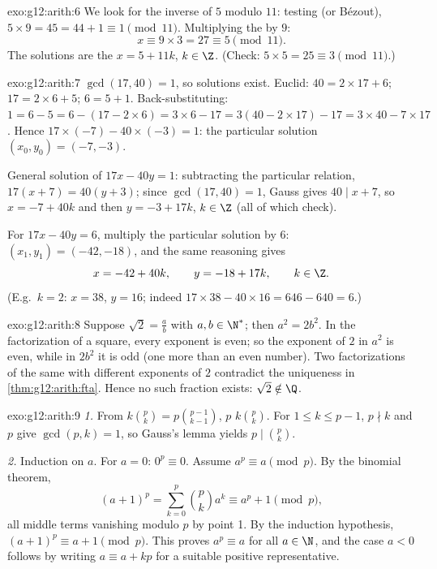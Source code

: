\begin{solution}{exo:g12:arith:6}
We look for the inverse of $5$ modulo $11$: testing (or Bézout),
$5 \times 9 = 45 = 44 + 1 \equiv 1 \pmod{11}$. Multiplying the  by
$9$:
\[
x \equiv 9 \times 3 = 27 \equiv 5 \pmod{11}.
\]
The solutions are the  $x = 5 + 11k$, $k \in \Z$. (Check:
$5\times5 = 25 \equiv 3 \pmod{11}$.)
\end{solution}

\begin{solution}{exo:g12:arith:7}
$\gcd(17, 40) = 1$, so solutions exist. Euclid:
$40 = 2\times17 + 6$; $17 = 2\times6 + 5$; $6 = 5 + 1$. Back-substituting:
$1 = 6 - 5 = 6 - (17 - 2\times6) = 3\times6 - 17
= 3(40 - 2\times17) - 17 = 3\times40 - 7\times17$. Hence
$17\times(-7) - 40\times(-3) = 1$: the particular solution
$(x_0, y_0) = (-7, -3)$.

General solution of $17x - 40y = 1$: subtracting the particular relation,
$17(x + 7) = 40(y + 3)$; since $\gcd(17, 40) = 1$, Gauss gives
$40 \mid x + 7$, so $x = -7 + 40k$ and then $y = -3 + 17k$, $k \in \Z$
(all of which check).

For $17x - 40y = 6$, multiply the particular solution by $6$:
$(x_1, y_1) = (-42, -18)$, and the same reasoning gives
\[
x = -42 + 40k, \qquad y = -18 + 17k, \qquad k \in \Z .
\]
(E.g.\ $k = 2$: $x = 38$, $y = 16$; indeed $17\times38 - 40\times16
= 646 - 640 = 6$.)
\end{solution}

\begin{solution}{exo:g12:arith:8}
Suppose $\sqrt2 = \frac ab$ with $a, b \in \N^*$; then $a^2 = 2b^2$. In the
 factorization of a square, every exponent is even; so the exponent of
$2$ in $a^2$ is even, while in $2b^2$ it is odd (one more than an even
number). Two factorizations of the same  with different exponents of
$2$ contradict the uniqueness in \cref{thm:g12:arith:fta}. Hence no such
fraction exists: $\sqrt2 \notin \Q$.
\end{solution}

\begin{solution}{exo:g12:arith:9}
\emph{1.} From $k\binom pk = p \binom{p-1}{k-1}$, $p$ 
$k\binom pk$. For $1 \leq k \leq p-1$, $p \nmid k$ and $p$  give
$\gcd(p, k) = 1$, so Gauss's lemma yields $p \mid \binom pk$.

\emph{2.} Induction on $a$. For $a = 0$: $0^p \equiv 0$. Assume
$a^p \equiv a \pmod p$. By the binomial theorem,
\[
(a+1)^p = \sum_{k=0}^{p} \binom pk a^k
\equiv a^p + 1 \pmod p,
\]
all middle terms vanishing modulo $p$ by point 1. By the induction
hypothesis, $(a+1)^p \equiv a + 1 \pmod p$. This proves
$a^p \equiv a$ for all $a \in \N$, and the case $a < 0$ follows by writing
$a \equiv a + kp$ for a suitable positive representative.
\end{solution}

